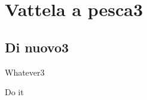\section{Vattela a pesca3}

\subsection{ Di nuovo3}

\begin{frame}[fragile]{Whatever3}

  Do it 

\end{frame}

